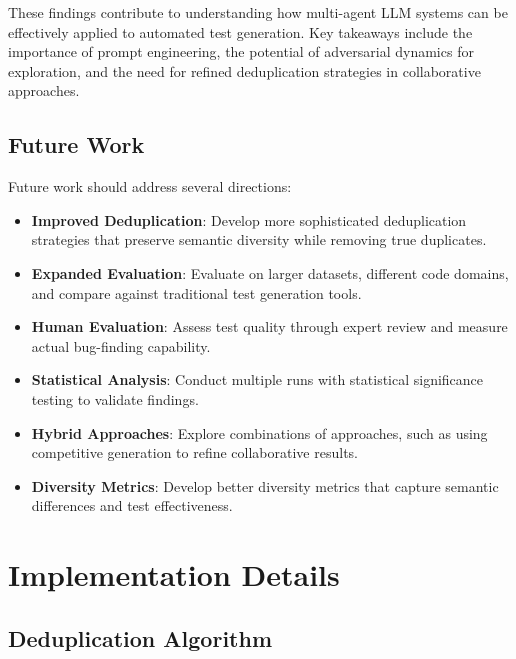 \documentclass[11pt]{article}
\begin{document}
These findings contribute to understanding how multi-agent LLM systems can be effectively applied to automated test generation. Key takeaways include the importance of prompt engineering, the potential of adversarial dynamics for exploration, and the need for refined deduplication strategies in collaborative approaches.

\subsection{Future Work}

Future work should address several directions:

\begin{itemize}
\item \textbf{Improved Deduplication}: Develop more sophisticated deduplication strategies that preserve semantic diversity while removing true duplicates.
\item \textbf{Expanded Evaluation}: Evaluate on larger datasets, different code domains, and compare against traditional test generation tools.
\item \textbf{Human Evaluation}: Assess test quality through expert review and measure actual bug-finding capability.
\item \textbf{Statistical Analysis}: Conduct multiple runs with statistical significance testing to validate findings.
\item \textbf{Hybrid Approaches}: Explore combinations of approaches, such as using competitive generation to refine collaborative results.
\item \textbf{Diversity Metrics}: Develop better diversity metrics that capture semantic differences and test effectiveness.
\end{itemize}



\appendix

\makeatletter
\renewcommand{\@seccntformat}[1]{Appendix \csname the#1\endcsname. \quad}
\makeatother

\section{Implementation Details}
\label{app:implementation}

\subsection{Deduplication Algorithm}
\end{document}
